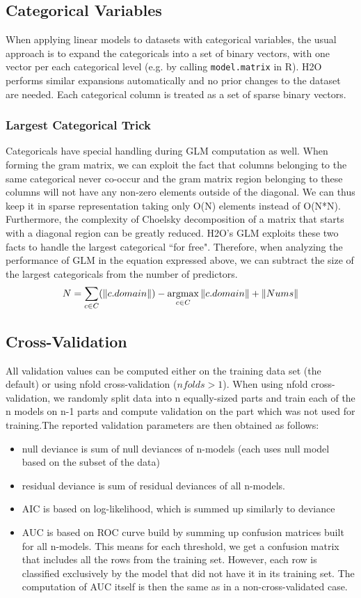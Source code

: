 \documentclass[11pt]{article}
\newcommand{\argmax}{\operatornamewithlimits{argmax}}
\begin{document}
\subsection{Categorical Variables}
When applying linear models to datasets with categorical variables, the usual approach is to expand the categoricals into a set of binary vectors, with one vector per each categorical level (e.g. by calling {\texttt{model.matrix}} in R). H2O performs similar expansions automatically and no prior changes to the dataset are needed. Each categorical column is treated as a set of sparse binary vectors.

\subsubsection{Largest Categorical Trick}
Categoricals have special handling during GLM computation as well. When forming the gram matrix, we can exploit the fact that columns belonging to the same categorical never co-occur and the gram matrix region belonging to these columns will not have any non-zero elements outside of the diagonal. We can thus keep it in sparse representation taking only O(N) elements instead of O(N*N). Furthermore, the complexity of Choelsky decomposition of a matrix that starts with a diagonal region can be greatly reduced. H2O's GLM exploits these two facts to handle the largest categorical ``for free". Therefore, when analyzing the performance of GLM in the equation expressed above, we can subtract the size of the largest categoricals from the number of predictors.
\[ N = \sum\limits_{c \in C} (\|c.domain\|) - \argmax\limits_{c \in C} \|c.domain\|  + \| Nums \| \]

\subsection{Cross-Validation}
All validation values can be computed either on the training data set (the default) or using nfold cross-validation ($nfolds > 1$). When using nfold cross-validation, we randomly split data into n equally-sized parts and train each of the n models on n-1 parts and compute validation on the part which was not used for training.The reported validation parameters are then obtained as follows:
\begin{itemize} 
\item null deviance is sum of null deviances of n-models (each uses null model based on the subset of the data)
\item residual deviance is sum of residual deviances of all n-models.
\item AIC is based on log-likelihood, which is summed up similarly to deviance
\item AUC is based on ROC curve build  by summing up confusion matrices built for all n-models.
This means for each threshold, we get a confusion matrix that includes all the rows from
the training set. However, each row is classified exclusively by the model
that did not have it in its training set. The computation of AUC itself is then the same as in a non-cross-validated case. 
\end{itemize}
\end{document}

